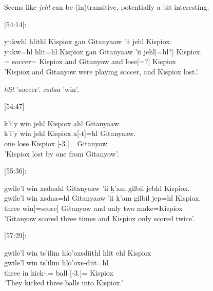 Seems like \textit{jehl} can be (in)transitive, potentially a bit interesting.

[54:14]: \begin{exe}
    \ex \glll
    yukwhl hlithl Kispiox g̱an Gitanyaaw 'ii jehl Kispiox. \\ 
    yukw=hl hlit=hl Kispiox g̱an Gitanyaaw 'ii jehl[=hl?] Kispiox. \\ 
    \Prog=\Cn{} soccer=\Cn{} Kispiox and Gitanyow and lose[=\Cn?] Kispiox \\
    \glt 'Kispiox and Gitanyow were playing soccer, and Kispiox lost.'.
\end{exe}

\textit{hlit} 'soccer'. \textit{xsdaa} 'win'.

[54:47]
\begin{exe}
    \ex \glll
    k'i'y win jehl Kispiox ahl Gitanyaaw. \\ 
    k'i'y win jehl Kispiox a[-t]=hl Gitanyaaw. \\ 
    one \Comp{} lose Kispiox \Prep{}[-3.\Ii]=\Cn{} Gitanyow \\
    \glt 'Kispiox lost by one from Gitanyow'.
\end{exe}


[55:36]:
\begin{exe}
    \ex \glll
    gwile'l win xsdaahl Gitanyaaw 'ii ḵ'am gilbil jebhl Kispiox. \\ 
    gwile'l win xsdaa=hl Gitanyaaw 'ii ḵ'am gilbil jep=hl Kispiox. \\ 
    three \Comp{} win[=score] Gitanyow and only two make=\Cn Kispiox \\
    \glt 'Gitanyow scored three times and Kispiox only scored twice'.
\end{exe}

[57:29]: 
\begin{exe}
    \ex \glll
    gwile'l win ts'ilim hlo'oxsdiithl hlit ehl Kispiox \\
    gwile'l win ts'ilim hlo'oxs-diit=hl \\
    three \Comp{} in kick-\Tpl.\Ii=\Cn{} ball \Prep{}[-3.\Ii]=\Cn{} Kispiox \\
    \glt `They kicked three balls into Kispiox.'
\end{exe}

